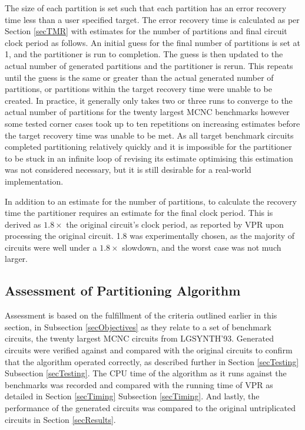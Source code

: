 \documentclass[12pt,final,oneside]{dwThesis} %
\begin{document}
    The size of each partition is set such that each partition has an error recovery time less than a user specified target.
    The error recovery time is calculated as per Section \ref{secTMR} with estimates for the number of partitions and final circuit clock period as follows.
    An initial guess for the final number of partitions is set at 1, and the partitioner is run to completion.
    The guess is then updated to the actual number of generated partitions and the partitioner is rerun. This repeats until the guess is the same or greater than the actual generated number of partitions, or partitions within the target recovery time were unable to be created.
    In practice, it generally only takes two or three runs to converge to the actual number of partitions for the twenty largest \gls{MCNC} benchmarks however some tested corner cases took up to ten repetitions on increasing estimates before the target recovery time was unable to be met.
    As all target benchmark circuits completed partitioning relatively quickly and it is impossible for the partitioner to be stuck in an infinite loop of revising its estimate optimising this estimation was not considered necessary, but it is still desirable for a real-world implementation.
    
    In addition to an estimate for the number of partitions, to calculate the recovery time the partitioner requires an estimate for the final clock period. This is derived as $1.8\times$ the original circuit's clock period, as reported by \gls{VPR} upon processing the original circuit. 1.8 was experimentally chosen, as the majority of circuits were well under a $1.8\times$ slowdown, and the worst case was not much larger.
    
   
   \subsection{Assessment of
      Partitioning Algorithm} Assessment is based on the fulfillment of
   the criteria outlined earlier in this section, in Subsection
   \ref{secObjectives} as they relate to a set of benchmark circuits, the
   twenty largest MCNC circuits from LGSYNTH'93.  Generated circuits were
   verified against and compared with the original circuits to confirm
   that the algorithm operated correctly, as described further in Section
   \ref{secTesting} Subsection \ref{secTesting}.  The \gls{CPU} time of
   the algorithm as it runs against the benchmarks was recorded and
   compared with the running time of \gls{VPR} as detailed in Section
   \ref{secTiming} Subsection \ref{secTiming}.  And lastly, the
   performance of the generated circuits was compared to the original
   untriplicated circuits in Section \ref{secResults}.
\end{document}
